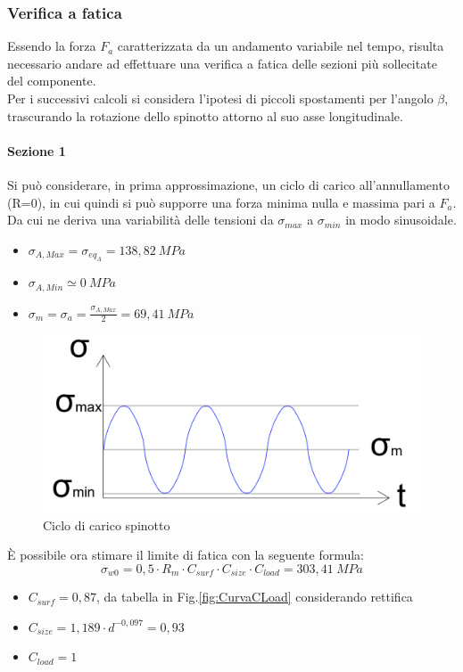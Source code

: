 \subsubsection{Verifica a fatica}
Essendo la forza $F_a$ caratterizzata da un andamento variabile nel tempo, risulta necessario andare ad effettuare una verifica a fatica delle sezioni più sollecitate del componente.\\
Per i successivi calcoli si considera l'ipotesi di piccoli spostamenti per l'angolo $\beta$, trascurando la rotazione dello spinotto attorno al suo asse longitudinale.
\paragraph{Sezione 1} Si può considerare, in prima approssimazione, un ciclo di carico all'annullamento (R=0), in cui quindi si può supporre una forza minima nulla e massima pari a $F_a$. Da cui ne deriva una variabilità delle tensioni da $\sigma_{max}$ a $\sigma_{min}$ in modo sinusoidale.
\begin{itemize}
    \item $\sigma_{A,Max}=\sigma_{eq_{A}}=138,82\ MPa$
    \item $\sigma_{A,Min}\simeq0\ MPa$
    \item $\sigma_m=\sigma_a=\frac{\sigma_{A,Max}}{2}=69,41\ MPa$
\end{itemize}
\newpage
\begin{figure}[h]
    \centering
    \includegraphics[scale=0.4]{Immagini/CicloFaticaSpinotto.png}
    \caption{Ciclo di carico spinotto}
    \label{fig:CicloFaticaSpinotto}
\end{figure}
È possibile ora stimare il limite di fatica con la seguente formula:
\begin{equation}
    \sigma_{w0}=0,5\cdot R_m\cdot C_{surf}\cdot C_{size}\cdot C_{load}=303,41\ MPa
\end{equation}
\begin{itemize}
    \item $C_{surf}=0,87$, da tabella in Fig.\ref{fig:CurvaCLoad} considerando rettifica 
    \item $C_{size}=1,189\cdot d^{-0,097}=0,93$
    \item $C_{load}=1$
\end{itemize}
